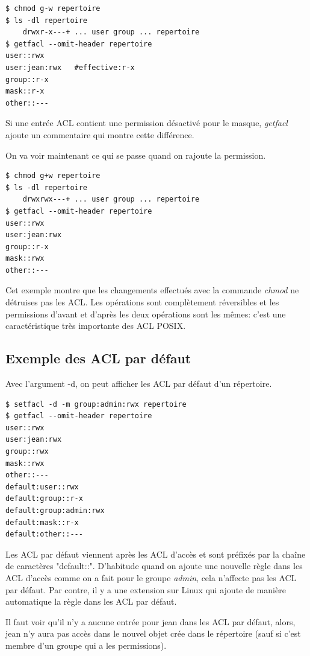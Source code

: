 \documentclass{article}
\begin{document}
\begin{verbatim}
$ chmod g-w repertoire 
$ ls -dl repertoire 
	drwxr-x---+ ... user group ... repertoire 
$ getfacl --omit-header repertoire 
user::rwx 
user:jean:rwx 	#effective:r-x
group::r-x 	
mask::r-x 
other::---

\end{verbatim}

Si une entrée ACL contient une permission désactivé pour le masque, \emph{getfacl} ajoute un commentaire qui montre cette différence.

On va voir maintenant ce qui se passe quand on rajoute la permission. 

\begin{verbatim}
$ chmod g+w repertoire 
$ ls -dl repertoire 
	drwxrwx---+ ... user group ... repertoire 
$ getfacl --omit-header repertoire 
user::rwx 
user:jean:rwx 
group::r-x
mask::rwx
other::---
\end{verbatim}

Cet exemple montre que les changements effectués avec la commande \emph{chmod} ne détruises pas les ACL. Les opérations sont complètement réversibles et les permissions d'avant et d'après les deux opérations sont les mêmes: c'est une caractéristique très importante des ACL POSIX. 

\subsection{Exemple des ACL par défaut}

Avec l'argument -d, on peut afficher les ACL par défaut d'un répertoire. 

\begin{verbatim}
$ setfacl -d -m group:admin:rwx repertoire 
$ getfacl --omit-header repertoire 
user::rwx
user:jean:rwx
group::rwx 
mask::rwx
other::---
default:user::rwx
default:group::r-x
default:group:admin:rwx
default:mask::r-x
default:other::---
\end{verbatim} 

Les ACL par défaut viennent après les ACL d'accès et sont préfixés par la chaîne de caractères "default::". D'habitude quand on ajoute une nouvelle règle dans les ACL d'accès comme on a fait pour le groupe \emph{admin}, cela n'affecte pas les ACL par défaut. Par contre, il y a une extension sur Linux qui ajoute de manière automatique la règle dans les ACL par défaut. 

Il faut voir qu'il n'y a aucune entrée pour jean dans les ACL par défaut, alors, jean n'y aura pas accès dans le nouvel objet crée dans le répertoire (sauf si c'est membre d'un groupe qui a les permissions). 
\end{document}
